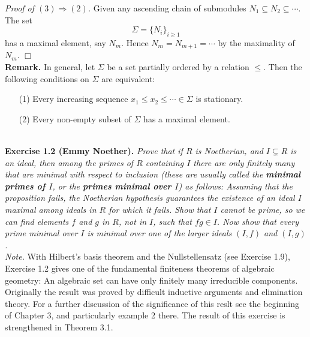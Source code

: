 \documentclass{article}
\begin{document}
\emph{Proof of $(3) \Rightarrow (2)$.}
Given any ascending chain of submodules $N_1 \subseteq N_2 \subseteq \cdots$.
The set $$\Sigma = \{N_i\}_{i \geq 1}$$ has a maximal element, say $N_m$.
Hence $N_m = N_{m+1} = \cdots$ by the maximality of $N_m$.
$\Box$ \\

\textbf{Remark.}
In general, let $\Sigma$ be a set partially ordered by a relation $\leq$.
Then the following conditions on $\Sigma$ are equivalent:
\begin{enumerate}
\item[(1)]
Every increasing sequence $x_1 \leq x_2 \leq \cdots \in \Sigma$ is stationary.
\item[(2)]
Every non-empty subset of $\Sigma$ has a maximal element. \\\\
\end{enumerate}






\textbf{Exercise 1.2 (Emmy Noether).}
\emph{Prove that if $R$ is Noetherian,
and $I \subsetneq R$ is an ideal,
then among the primes of $R$ containing $I$ there are only finitely many
that are minimal with respect to inclusion
(these are usually called the \textbf{minimal primes of $I$},
or the \textbf{primes minimal over $I$}) as follows:
Assuming that the proposition fails, the Noetherian hypothesis guarantees
the existence of an ideal $I$ maximal among ideals in $R$ for which it fails.
Show that $I$ cannot be prime,
so we can find elements $f$ and $g$ in $R$, not in $I$, such that $fg \in I$.
Now show that every prime minimal over $I$ is minimal over
one of the larger ideals $(I,f)$ and $(I,g)$.} \\

\emph{Note.}
With Hilbert's basis theorem and the Nullstellensatz (see Exercise 1.9),
Exercise 1.2 gives one of the fundamental finiteness theorems of algebraic geometry:
An algebraic set can have only finitely many irreducible components.
Originally the result was proved by difficult inductive arguments and elimination theory.
For a further discussion of the significance of this reslt
see the beginning of Chapter 3, and particularly example 2 there.
The result of this exercise is strengthened in Theorem 3.1. \\\\
\end{document}
